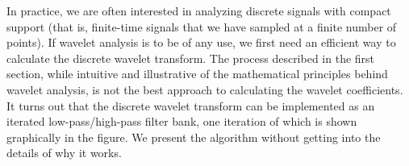 In practice, we are often interested in analyzing discrete signals with compact support (that is,
finite-time signals that we have sampled at a finite number of points). If wavelet analysis is
to be of any use, we first need an efficient way to calculate the discrete wavelet transform.
The process described in the first section, while intuitive and illustrative of the mathematical
principles
behind wavelet analysis, is not the best approach to calculating the wavelet coefficients. It
turns out that the discrete wavelet transform can be implemented as an iterated low-pass/high-pass
filter bank, one iteration of which is shown graphically in the figure. We present the
algorithm without getting into the details of why it works.
\begin{figure}[H]
\centering
{}

\vspace{2cm}


\end{figure}
